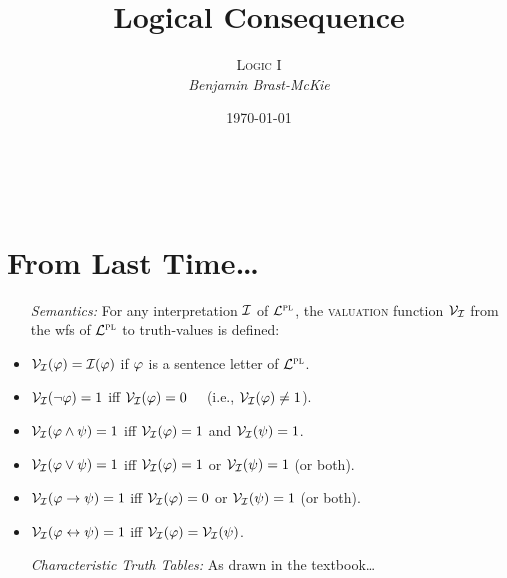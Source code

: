 \documentclass[a4paper, 11pt]{article} %
\title{\textbf{Logical Consequence}} %
\author{\textsc{Logic I}\\ \em Benjamin Brast-McKie} %
\date{\today} %
\makeatletter
\renewcommand{\maketitle}{
\begin{flushright}
{\LARGE\@title}

\vspace{10pt}

{\@author}
\\ \@date
\end{flushright}

\vspace{-20pt}

}
\makeatother
\begin{document}
\maketitle %

\thispagestyle{empty}



\section*{From Last Time\ldots}

\begin{itemize}[leftmargin=1in,labelsep=.15in] %
  \item[\it Semantics:] For any interpretation $\mathcal{I}$ of $\mathcal{L}^{\textsc{pl}}$, the \textsc{valuation} function $\mathcal{V}_{\mathcal{I}}$ from the wfs of $\mathcal{L}^{\textsc{pl}}$ to truth-values is defined:
    \item $\mathcal{V}_{\mathcal{I}}(\varphi)=\mathcal{I}(\varphi)$ if $\varphi$ is a sentence letter of $\mathcal{L}^{\textsc{pl}}$.
    \item $\mathcal{V}_{\mathcal{I}}(\neg\varphi)=1$ iff $\mathcal{V}_{\mathcal{I}}(\varphi)=0$~~ (i.e., $\mathcal{V}_{\mathcal{I}}(\varphi)\neq 1$).
    \item $\mathcal{V}_{\mathcal{I}}(\varphi \wedge \psi)=1$ iff $\mathcal{V}_{\mathcal{I}}(\varphi)=1$ and $\mathcal{V}_{\mathcal{I}}(\psi)=1$.
    \item $\mathcal{V}_{\mathcal{I}}(\varphi \vee \psi)=1$ iff $\mathcal{V}_{\mathcal{I}}(\varphi)=1$ or $\mathcal{V}_{\mathcal{I}}(\psi)=1$ (or both).
    \item $\mathcal{V}_{\mathcal{I}}(\varphi \rightarrow \psi)=1$ iff $\mathcal{V}_{\mathcal{I}}(\varphi)=0$ or $\mathcal{V}_{\mathcal{I}}(\psi)=1$ (or both).
    \item $\mathcal{V}_{\mathcal{I}}(\varphi \leftrightarrow \psi)=1$ iff $\mathcal{V}_{\mathcal{I}}(\varphi)=\mathcal{V}_{\mathcal{I}}(\psi)$.
  \item[\it Characteristic Truth Tables:] As drawn in the textbook\ldots
\end{itemize}
\end{document}
